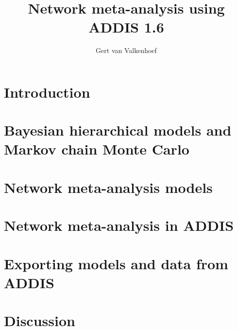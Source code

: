 \documentclass[a4paper]{report}
\title{Network meta-analysis using ADDIS 1.6}
\author{Gert van Valkenhoef}
\begin{document}
\maketitle

\tableofcontents

\chapter{Introduction}

\chapter{Bayesian hierarchical models and Markov chain Monte Carlo}

\chapter{Network meta-analysis models}

\chapter{Network meta-analysis in ADDIS}

\chapter{Exporting models and data from ADDIS}

\chapter{Discussion}
\end{document}

